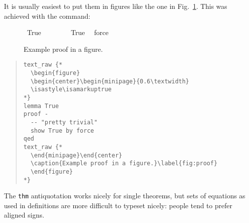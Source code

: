 \begin{isabellebody}
\begin{isamarkuptext}
  It is usually easiest to put them in figures like the one in Fig.\
  \ref{fig:proof}. This was achieved with the 
  command:%
\end{isamarkuptext}%
\isamarkuptrue%
%
\begin{figure}
  \begin{center}\begin{minipage}{0.6\textwidth}  
  \isastyle\isamarkuptrue
{}\isamarkupfalse%
\ True\isanewline
%
\isadelimproof
%
\endisadelimproof
%
\isatagproof
{}\isamarkupfalse%
\ {\isacharminus}\isanewline
\ \ %
\isanewline
\ \ \isamarkupfalse%
\ True\ \isamarkupfalse%
\ force\isanewline
{}\isamarkupfalse%
%
\endisatagproof
{\isafoldproof}%
%
\isadelimproof
%
\endisadelimproof
%
\end{minipage}\end{center}
  \caption{Example proof in a figure.}\label{fig:proof}
  \end{figure}
%
\begin{isamarkuptext}%
\begin{quote}
\small
\verb!text_raw {!\verb!*!\\
\verb!  \begin{figure}!\\
\verb!  \begin{center}\begin{minipage}{0.6\textwidth}!\\
\verb!  \isastyle\isamarkuptrue!\\
\verb!*!\verb!}!\\
\verb!lemma True!\\
\verb!proof -!\\
\verb!  -- "pretty trivial"!\\
\verb!  show True by force!\\
\verb!qed!\\
\verb!text_raw {!\verb!*!\\
\verb!  \end{minipage}\end{center}!\\
\verb!  \caption{Example proof in a figure.}\label{fig:proof}!\\
\verb!  \end{figure}!\\
\verb!*!\verb!}!
\end{quote}%
\end{isamarkuptext}%
\isamarkuptrue%
%
\isamarkuptrue%
%
\begin{isamarkuptext}%
The \verb!thm! antiquotation works nicely for single theorems, but
  sets of equations as used in definitions are more difficult to
  typeset nicely: people tend to prefer aligned \isa{{\isacharequal}} signs.


\end{isamarkuptext}
\end{isabellebody}
